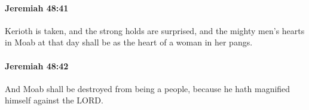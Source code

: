 		\paragraph{Jeremiah 48:41} %
			\label{JEREMIAH-48-41}

			Kerioth is taken, and the strong holds are surprised, and the mighty men’s hearts in Moab at that day shall be as the heart of a woman in her pangs.


		\paragraph{Jeremiah 48:42} %
			\label{JEREMIAH-48-42}

			And Moab shall be destroyed from being a people, because he hath magnified himself against the LORD.



